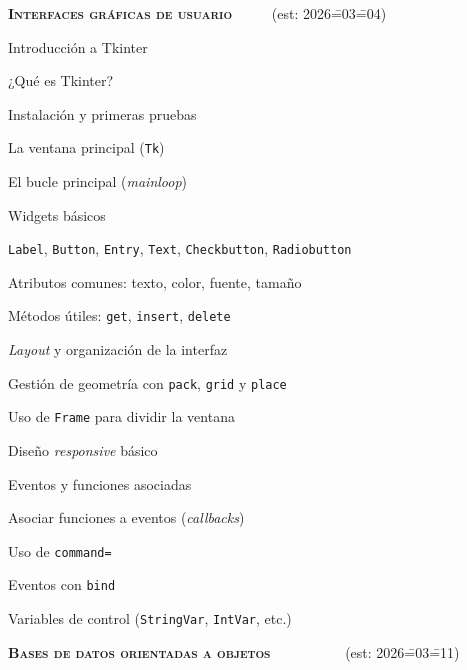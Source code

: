 \begin{longenum}
    \item \textbf{\textsc{Interfaces gráficas de usuario}} \ \ \ \ \ (est: 2026\==03\==04)
    \begin{longenum}
        \item Introducción a Tkinter
        \begin{longenum}
            \item ¿Qué es Tkinter?
            \item Instalación y primeras pruebas
            \item La ventana principal (\texttt{Tk})
            \item El bucle principal (\textit{mainloop})
        \end{longenum}
        \item Widgets básicos
        \begin{longenum}
            \item \texttt{Label}, \texttt{Button}, \texttt{Entry}, \texttt{Text}, \texttt{Checkbutton}, \texttt{Radiobutton}
            \item Atributos comunes: texto, color, fuente, tamaño
            \item Métodos útiles: \texttt{get}, \texttt{insert}, \texttt{delete}
        \end{longenum}
        \item \textit{Layout} y organización de la interfaz
        \begin{longenum}
            \item Gestión de geometría con \texttt{pack}, \texttt{grid} y \texttt{place}
            \item Uso de \texttt{Frame} para dividir la ventana
            \item Diseño \textit{responsive} básico
        \end{longenum}
        \item Eventos y funciones asociadas
        \begin{longenum}
            \item Asociar funciones a eventos (\textit{callbacks})
            \item Uso de \texttt{command=}
            \item Eventos con \texttt{bind}
            \item Variables de control (\texttt{StringVar}, \texttt{IntVar}, etc.)
        \end{longenum}
    \end{longenum}
    \item \textbf{\textsc{Bases de datos orientadas a objetos}} \ \ \ \ \ \ \ \ \ \ (est: 2026\==03\==11)

\end{longenum}
